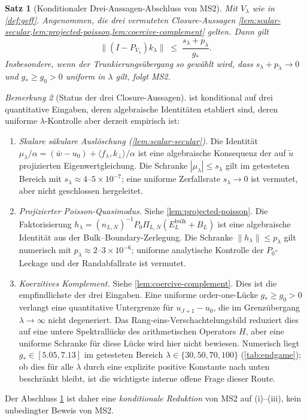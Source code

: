 \documentclass[12pt,a4paper]{article}
\newtheorem{theorem}{Satz}[section]
\theoremstyle{definition}
\theoremstyle{remark}
\newtheorem{remark}[theorem]{Bemerkung}
\newcommand{\ip}[2]{\langle #1, #2 \rangle}
\newcommand{\norm}[1]{\| #1 \|}
\newcommand{\utilde}{\tilde{u}}
\begin{document}
\begin{theorem}[Konditionaler Drei-Aussagen-Abschluss von MS2]
\label{thm:MS2-closure}
Mit $V_\lambda$ wie in \cref{def:geff}. Angenommen, die drei vermuteten
Closure-Aussagen \cref{lem:scalar-secular,lem:projected-poisson,lem:coercive-complement}
gelten. Dann gilt
\begin{equation}
\label{eq:mass-bound}
  \norm{(I - P_{V_\lambda}) k_\lambda}
  \;\leq\; \frac{s_\lambda + p_\lambda}{g_*}.
\end{equation}
Insbesondere, wenn der Trunkierungsübergang so gewählt wird, dass
$s_\lambda + p_\lambda \to 0$ und $g_* \ge g_0 > 0$ uniform in
$\lambda$ gilt, folgt MS2.
\end{theorem}

\begin{remark}[Status der drei Closure-Aussagen]
\label{rem:endgame-status}
 ist konditional auf drei quantitative Eingaben,
deren algebraische Identitäten etabliert sind, deren uniforme
$\lambda$-Kontrolle aber derzeit empirisch ist:
\begin{enumerate}[label=(\roman*),leftmargin=*]
  \item \emph{Skalare säkulare Auslöschung
  \textup{(\cref{lem:scalar-secular})}.} Die Identität
  $\mu_\lambda/\alpha=(\bar w-u_0)+\ip{f_\lambda}{k_\perp}/\alpha$ ist eine
  algebraische Konsequenz der auf $\utilde$ projizierten Eigenwertgleichung.
  Die Schranke $|\mu_\lambda|\le s_\lambda$ gilt im getesteten Bereich mit
  $s_\lambda\approx 4$--$5\times 10^{-7}$; eine uniforme Zerfallsrate
  $s_\lambda\to 0$ ist vermutet, aber nicht geschlossen hergeleitet.
  \item \emph{Projizierter Poisson-Quasimodus.}
  Siehe \cref{lem:projected-poisson}. Die Faktorisierung
  $h_\lambda=(n_{L,N})^{-1}P_0\Pi_{L,N}(E_L^{\mathrm{bulk}}+B_L)$ ist eine
  algebraische Identität aus der Bulk--Boundary-Zerlegung. Die Schranke
  $\norm{h_\lambda}\le p_\lambda$ gilt numerisch mit
  $p_\lambda\approx 2$--$3\times 10^{-6}$; uniforme analytische Kontrolle
  der $P_0$-Leckage und der Randabfallrate ist vermutet.
\item \emph{Koerzitives Komplement.}
  Siehe \cref{lem:coercive-complement}. Dies ist die empfindlichste
  der drei Eingaben. Eine uniforme order-one-Lücke
  $g_* \ge g_0 > 0$ verlangt eine quantitative Untergrenze für
  $u_{J+1}-u_0$, die im Grenzübergang $\lambda\to\infty$ nicht degeneriert.
  Das Rang-eins-Verschachtelungsbild reduziert dies auf eine untere
  Spektrallücke des arithmetischen Operators $H$, aber eine uniforme
  Schranke für diese Lücke wird hier nicht bewiesen. Numerisch liegt
  $g_* \in [5.05,7.13]$ im getesteten Bereich
  $\lambda\in\{30,50,70,100\}$ (\cref{tab:endgame}); ob dies für alle
  $\lambda$ durch eine explizite positive Konstante nach unten beschränkt
  bleibt, ist die wichtigste interne offene Frage dieser Route.
\end{enumerate}
Der Abschluss \cref{thm:MS2-closure} ist daher eine \emph{konditionale
Reduktion} von MS2 auf (i)--(iii), kein unbedingter Beweis von MS2.
\end{remark}
\end{document}
